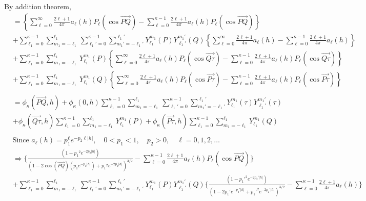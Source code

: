 \documentclass[11pt]{article}
\begin{document}
\begin{itemize}
By addition theorem,\\
\begin{align*}
&= \left\{ \sum_{\ell=0}^\infty \frac{2\ell+1}{4\pi} a_\ell(h) P_\ell(\cos{\overrightarrow{PQ}}) -  \sum_{\ell=0}^{\kappa-1} \frac{2\ell+1}{4\pi} a_\ell(h) P_\ell(\cos{\overrightarrow{PQ}}) \right\}\\ 
&+ \sum_{\ell_1=0}^{\kappa-1} \sum_{m_1=-\ell_1}^{\ell_1}  \sum_{\ell_1'=0}^{\kappa-1} \sum_{m_1'=-\ell_1'}^{\ell_1'} Y_{\ell_1}^{m_1}(P)Y_{\ell_1'}^{m_1'}(Q) \left\{ \sum_{\ell=0}^{\infty}  \frac{2\ell+1}{4\pi} a_{\ell}(h) - \sum_{\ell=0}^{\kappa-1} \frac{2\ell+1}{4\pi} a_{\ell}(h) \right\}\\
&+ \sum_{\ell_1=0}^{\kappa-1} \sum_{m_1=-\ell_1}^{\ell_1} Y_{\ell_1}^{m_1}(P) \left\{ \sum_{\ell=0}^{\infty}  \frac{2\ell+1}{4\pi} a_{\ell}(h)  P_\ell(\cos{\overrightarrow{Q\tau}}) - \sum_{\ell=0}^{\kappa-1} \frac{2\ell+1}{4\pi} a_{\ell}(h)  P_\ell(\cos{\overrightarrow{Q\tau}}) \right\}\\ 
&+ \sum_{\ell_1=0}^{\kappa-1} \sum_{m_1=-\ell_1}^{\ell_1} Y_{\ell_1}^{m_1}(Q) \left\{ \sum_{\ell=0}^{\infty}  \frac{2\ell+1}{4\pi} a_{\ell}(h)  P_\ell(\cos{\overrightarrow{P \tau}}) - \sum_{\ell=0}^{\kappa-1}  \frac{2\ell+1}{4\pi} a_{\ell}(h)  P_\ell(\cos{\overrightarrow{P\tau}}) \right\}\\
\\
&= \phi_{\kappa}(\overrightarrow{PQ},h) + \phi_{\kappa}(0,h) \sum_{\ell_1=0}^{\kappa-1} \sum_{m_1=-\ell_1}^{\ell_1} \sum_{\ell_1'=0}^{\kappa-1} \sum_{m_1'=-\ell_1'}^{\ell_1'} Y_{\ell_1}^{m_1}(\tau) Y_{\ell_1'}^{m_1'}(\tau)\\ 
&+ \phi_{\kappa}(\overrightarrow{Q\tau},h) \sum_{\ell_1=0}^{\kappa-1} \sum_{m_1=-\ell_1}^{\ell_1} Y_{\ell_1}^{m_1}(P) + \phi_{\kappa}(\overrightarrow{P\tau},h) \sum_{\ell_1=0}^{\kappa-1} \sum_{m_1=-\ell_1}^{\ell_1} Y_{\ell_1}^{m_1}(Q)\\
\\
&\text{Since } a_\ell(h)=p_1^\ell e^{-p_2 \ell |h|}, \quad 0<p_1<1, \quad p_2>0, \quad \ell=0,1,2,\dots\\
&\Rightarrow \biggl\{ \frac{(1 - {p_1}^2 e^{-2 p_2 \lvert h \lvert})}{(1-2 \cos{(\overrightarrow{PQ})} (p_1 e^{-p_2 \lvert h \lvert}) + {p_1}^2 e^{-2p_2 \lvert h \lvert})^{3/2}} - \sum_{\ell=0}^{\kappa-1} \frac{2\ell+1}{4\pi} a_\ell(h) P_\ell(\cos{\overrightarrow{PQ}}) \biggl\}\\
&+ \sum_{\ell_1=0}^{\kappa-1} \sum_{m_1=-\ell_1}^{\ell_1}  \sum_{\ell_1'=0}^{\kappa-1} \sum_{m_1'=-\ell_1'}^{\ell_1'} Y_{\ell_1}^{m_1}(P)Y_{\ell_1'}^{m_1'}(Q) \biggl\{ \frac{(1 - {p_1'}^2 e^{-2 p_2' \lvert h \lvert})}{(1-2 p_1' e^{-p_2' \lvert h \lvert} + {p_1'}^2 e^{-2p_2' \lvert h \lvert})^{3/2}} - \sum_{\ell=0}^{\kappa-1} \frac{2\ell+1}{4\pi} a_{\ell}(h) \biggl\}\\ 

\end{align*}
\end{itemize}
\end{document}

